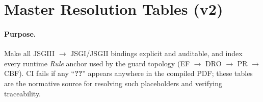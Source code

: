 \section{Master Resolution Tables (v2)}\label{app:resolution}

\paragraph{Purpose.}
Make all JSGIII $\rightarrow$ JSGI/JSGII bindings explicit and auditable, and index every runtime \emph{Rule} anchor used by the guard topology (EF $\rightarrow$ DRO $\rightarrow$ PR $\rightarrow$ CBF). CI fails if any “\textbf{??}” appears anywhere in the compiled PDF; these tables are the normative source for resolving such placeholders and verifying traceability.


